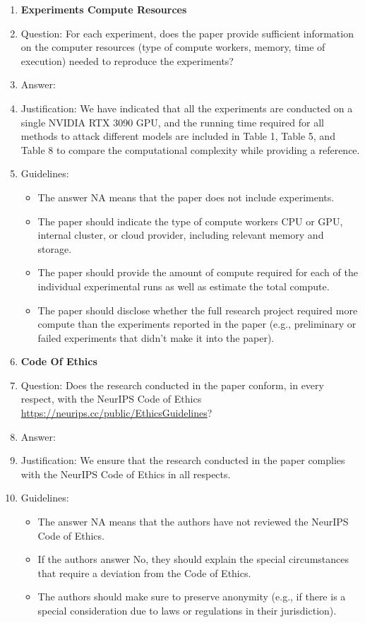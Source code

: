 \documentclass{article}
\begin{document}
\begin{enumerate}
\item {\bf Experiments Compute Resources}
    \item[] Question: For each experiment, does the paper provide sufficient information on the computer resources (type of compute workers, memory, time of execution) needed to reproduce the experiments?
    \item[] Answer: \answerYes{} %
    \item[] Justification: We have indicated that all the experiments are conducted on a single NVIDIA RTX 3090 GPU, and the running time required for all methods to attack different models are included in Table 1, Table 5, and Table 8 to compare the computational complexity while providing a reference.
    \item[] Guidelines:
    \begin{itemize}
        \item The answer NA means that the paper does not include experiments.
        \item The paper should indicate the type of compute workers CPU or GPU, internal cluster, or cloud provider, including relevant memory and storage.
        \item The paper should provide the amount of compute required for each of the individual experimental runs as well as estimate the total compute. 
        \item The paper should disclose whether the full research project required more compute than the experiments reported in the paper (e.g., preliminary or failed experiments that didn't make it into the paper). 
    \end{itemize}
    
\item {\bf Code Of Ethics}
    \item[] Question: Does the research conducted in the paper conform, in every respect, with the NeurIPS Code of Ethics \url{https://neurips.cc/public/EthicsGuidelines}?
    \item[] Answer: \answerYes{} %
    \item[] Justification: We ensure that the research conducted in the paper complies with the NeurIPS Code of Ethics in all respects.
    \item[] Guidelines: 
    \begin{itemize}
        \item The answer NA means that the authors have not reviewed the NeurIPS Code of Ethics.
        \item If the authors answer No, they should explain the special circumstances that require a deviation from the Code of Ethics.
        \item The authors should make sure to preserve anonymity (e.g., if there is a special consideration due to laws or regulations in their jurisdiction).
    \end{itemize}



\end{enumerate}
\end{document}
